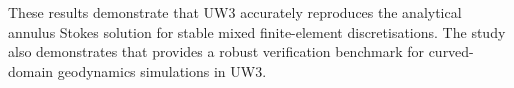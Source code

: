 \documentclass[gmd, manuscript]{copernicus}
\begin{document}
These results demonstrate that UW3 accurately reproduces the analytical
annulus Stokes solution for stable mixed finite-element
discretisations. The study also demonstrates that  
provides a robust verification benchmark for curved-domain 
geodynamics simulations in UW3.


















\end{document}
